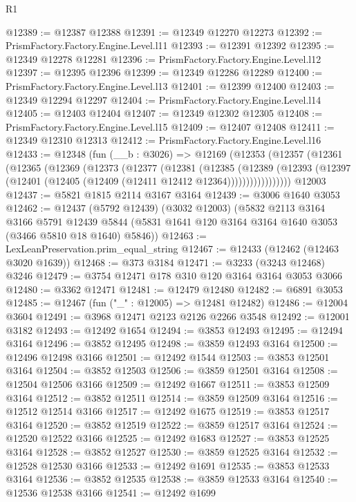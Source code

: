 \begin{lexlean}{R1}
\begin{coremodule}
@12389 := @12387 @12388
@12391 := @12349 @12270 @12273
@12392 := PrismFactory.Factory.Engine.Level.l11
@12393 := @12391 @12392
@12395 := @12349 @12278 @12281
@12396 := PrismFactory.Factory.Engine.Level.l12
@12397 := @12395 @12396
@12399 := @12349 @12286 @12289
@12400 := PrismFactory.Factory.Engine.Level.l13
@12401 := @12399 @12400
@12403 := @12349 @12294 @12297
@12404 := PrismFactory.Factory.Engine.Level.l14
@12405 := @12403 @12404
@12407 := @12349 @12302 @12305
@12408 := PrismFactory.Factory.Engine.Level.l15
@12409 := @12407 @12408
@12411 := @12349 @12310 @12313
@12412 := PrismFactory.Factory.Engine.Level.l16
@12433 := @12348
    (fun (__b : @3026) =>
    @12169
      (@12353
        (@12357
          (@12361
            (@12365
              (@12369
                (@12373
                  (@12377
                    (@12381
                      (@12385
                        (@12389
                          (@12393
                            (@12397 (@12401 (@12405 (@12409 (@12411 @12412 @12364)))))))))))))))))
    @12003
@12437 := @5821 @1815 @2114 @3167 @3164
@12439 := @3006 @1640 @3053
@12462 := @12437
    (@5792 @12439)
    (@3032 @12003)
    (@5832
      @2113
      @3164
      @3166
      @5791
      @12439
      @5844
      (@5831 @1641 @120 @3164 @3164 @1640 @3053 (@3466 @5810 @18 @1640) @5846))
@12463 := LexLeanPreservation.prim_equal_string
@12467 := @12433 (@12462 (@12463 @3020 @1639))
@12468 := @373 @3184
@12471 := @3233 (@3243 @12468) @3246
@12479 := @3754 @12471 @178 @310 @120 @3164 @3164 @3053 @3066
@12480 := @3362 @12471
@12481 := @12479 @12480
@12482 := @6891 @3053
@12485 := @12467 (fun ("_" : @12005) => @12481 @12482)
@12486 := @12004 @3604
@12491 := @3968 @12471 @2123 @2126 @2266 @3548
@12492 := @12001 @3182
@12493 := @12492 @1654
@12494 := @3853 @12493
@12495 := @12494 @3164
@12496 := @3852 @12495
@12498 := @3859 @12493 @3164
@12500 := @12496 @12498 @3166
@12501 := @12492 @1544
@12503 := @3853 @12501 @3164
@12504 := @3852 @12503
@12506 := @3859 @12501 @3164
@12508 := @12504 @12506 @3166
@12509 := @12492 @1667
@12511 := @3853 @12509 @3164
@12512 := @3852 @12511
@12514 := @3859 @12509 @3164
@12516 := @12512 @12514 @3166
@12517 := @12492 @1675
@12519 := @3853 @12517 @3164
@12520 := @3852 @12519
@12522 := @3859 @12517 @3164
@12524 := @12520 @12522 @3166
@12525 := @12492 @1683
@12527 := @3853 @12525 @3164
@12528 := @3852 @12527
@12530 := @3859 @12525 @3164
@12532 := @12528 @12530 @3166
@12533 := @12492 @1691
@12535 := @3853 @12533 @3164
@12536 := @3852 @12535
@12538 := @3859 @12533 @3164
@12540 := @12536 @12538 @3166
@12541 := @12492 @1699

\end{coremodule}
\end{lexlean}
